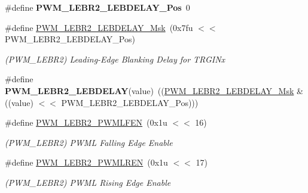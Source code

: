 \begin{DoxyCompactItemize}
\mbox{\label{group__SAMS70__PWM_ga081e1b637eb742c88f009c93b397f831}} 
\#define {\bfseries P\+W\+M\+\_\+\+L\+E\+B\+R2\+\_\+\+L\+E\+B\+D\+E\+L\+A\+Y\+\_\+\+Pos}~0
\item 
\mbox{\label{group__SAMS70__PWM_ga6217bfce3c3d3fc7be8b1ebdbeee8a7b}} 
\#define \mbox{\hyperlink{group__SAMS70__PWM_ga6217bfce3c3d3fc7be8b1ebdbeee8a7b}{P\+W\+M\+\_\+\+L\+E\+B\+R2\+\_\+\+L\+E\+B\+D\+E\+L\+A\+Y\+\_\+\+Msk}}~(0x7fu $<$$<$ P\+W\+M\+\_\+\+L\+E\+B\+R2\+\_\+\+L\+E\+B\+D\+E\+L\+A\+Y\+\_\+\+Pos)
\begin{DoxyCompactList}\small\item\em (P\+W\+M\+\_\+\+L\+E\+B\+R2) Leading-\/\+Edge Blanking Delay for T\+R\+G\+I\+Nx \end{DoxyCompactList}\item 
\mbox{\label{group__SAMS70__PWM_ga3d193321d2e282e547e2cfbc15d344f0}} 
\#define {\bfseries P\+W\+M\+\_\+\+L\+E\+B\+R2\+\_\+\+L\+E\+B\+D\+E\+L\+AY}(value)~((\mbox{\hyperlink{group__SAMV71__PWM_ga6217bfce3c3d3fc7be8b1ebdbeee8a7b}{P\+W\+M\+\_\+\+L\+E\+B\+R2\+\_\+\+L\+E\+B\+D\+E\+L\+A\+Y\+\_\+\+Msk}} \& ((value) $<$$<$ P\+W\+M\+\_\+\+L\+E\+B\+R2\+\_\+\+L\+E\+B\+D\+E\+L\+A\+Y\+\_\+\+Pos)))
\item 
\mbox{\label{group__SAMS70__PWM_ga6ed17098b3cf97e2d00a6198259e93a8}} 
\#define \mbox{\hyperlink{group__SAMS70__PWM_ga6ed17098b3cf97e2d00a6198259e93a8}{P\+W\+M\+\_\+\+L\+E\+B\+R2\+\_\+\+P\+W\+M\+L\+F\+EN}}~(0x1u $<$$<$ 16)
\begin{DoxyCompactList}\small\item\em (P\+W\+M\+\_\+\+L\+E\+B\+R2) P\+W\+ML Falling Edge Enable \end{DoxyCompactList}\item 
\mbox{\label{group__SAMS70__PWM_ga284196fdc7b855a2f550855d437dd86e}} 
\#define \mbox{\hyperlink{group__SAMS70__PWM_ga284196fdc7b855a2f550855d437dd86e}{P\+W\+M\+\_\+\+L\+E\+B\+R2\+\_\+\+P\+W\+M\+L\+R\+EN}}~(0x1u $<$$<$ 17)
\begin{DoxyCompactList}\small\item\em (P\+W\+M\+\_\+\+L\+E\+B\+R2) P\+W\+ML Rising Edge Enable \end{DoxyCompactList}\item 
\mbox{\label{group__SAMS70__PWM_gae015ab5851301e4bfc757130818ae196}} 

\end{DoxyCompactItemize}
